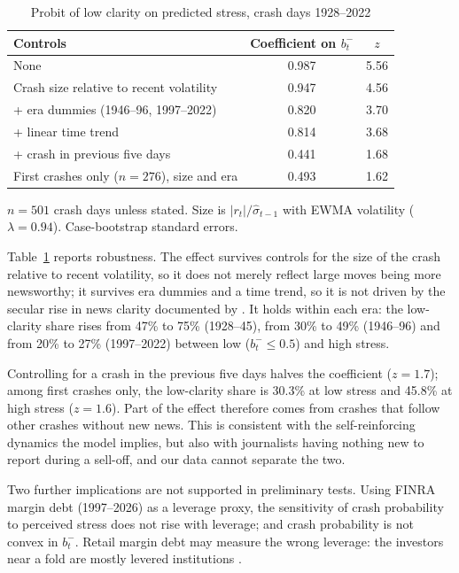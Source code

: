 \documentclass[11pt,a4paper]{article}
\begin{document}
\begin{table}[ht]
\centering
\begin{threeparttable}
\caption{Probit of low clarity on predicted stress, crash days 1928--2022}
\label{tab:robust}
\small
\begin{tabular}{lcc}
\toprule
Controls & Coefficient on $b^-_t$ & $z$ \\
\midrule
None & 0.987 & 5.56 \\
Crash size relative to recent volatility & 0.947 & 4.56 \\
+ era dummies (1946--96, 1997--2022) & 0.820 & 3.70 \\
+ linear time trend & 0.814 & 3.68 \\
+ crash in previous five days & 0.441 & 1.68 \\
First crashes only ($n=276$), size and era & 0.493 & 1.62 \\
\bottomrule
\end{tabular}
\begin{tablenotes}\footnotesize
\item $n=501$ crash days unless stated. Size is $|r_t|/\hat\sigma_{t-1}$ with EWMA volatility
($\lambda=0.94$). Case-bootstrap standard errors.
\end{tablenotes}
\end{threeparttable}
\end{table}

Table~\ref{tab:robust} reports robustness. The effect survives controls for the size of the
crash relative to recent volatility, so it does not merely reflect large moves being more
newsworthy; it survives era dummies and a time trend, so it is not driven by the secular rise
in news clarity documented by \citet{BBDS2021}. It holds within each era: the low-clarity
share rises from 47\% to 75\% (1928--45), from 30\% to 49\% (1946--96) and from 20\% to 27\%
(1997--2022) between low ($b^-_t\le0.5$) and high stress.

Controlling for a crash in the previous five days halves the coefficient ($z=1.7$); among
first crashes only, the low-clarity share is 30.3\% at low stress and 45.8\% at high stress
($z=1.6$). Part of the effect therefore comes from crashes that follow other crashes without
new news. This is consistent with the self-reinforcing dynamics the model implies, but also
with journalists having nothing new to report during a sell-off, and our data cannot separate
the two.

Two further implications are not supported in preliminary tests. Using FINRA margin debt
(1997--2026) as a leverage proxy, the sensitivity of crash probability to perceived stress
does not rise with leverage; and crash probability is not convex in $b^-_t$. Retail margin
debt may measure the wrong leverage: the investors near a fold are mostly levered
institutions \citep{AdrianEtulaMuir2014}.
\end{document}
